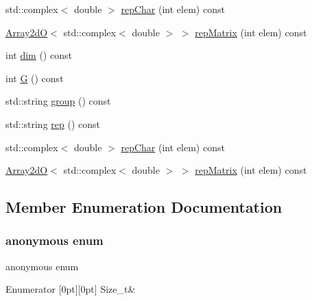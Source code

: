\begin{DoxyCompactItemize}
\item 
std\+::complex$<$ double $>$ \mbox{\hyperlink{structHadron_1_1HgRep_a49537241226a4b230d73e72cb1a21de3}{rep\+Char}} (int elem) const
\item 
\mbox{\hyperlink{classADAT_1_1Array2dO}{Array2dO}}$<$ std\+::complex$<$ double $>$ $>$ \mbox{\hyperlink{structHadron_1_1HgRep_a1ca0a9c28a8e0a9aba561029b7e61f08}{rep\+Matrix}} (int elem) const
\item 
int \mbox{\hyperlink{structHadron_1_1HgRep_ad951f39b175b012e73b0f66217b25032}{dim}} () const
\item 
int \mbox{\hyperlink{structHadron_1_1HgRep_a80baf377b3f2e8d633bba539efea8d04}{G}} () const
\item 
std\+::string \mbox{\hyperlink{structHadron_1_1HgRep_a271e1ec9a6f40512f32c8c573e42dff7}{group}} () const
\item 
std\+::string \mbox{\hyperlink{structHadron_1_1HgRep_a229b19e7f1d4fa443b715de9b5ed4454}{rep}} () const
\item 
std\+::complex$<$ double $>$ \mbox{\hyperlink{structHadron_1_1HgRep_a49537241226a4b230d73e72cb1a21de3}{rep\+Char}} (int elem) const
\item 
\mbox{\hyperlink{classADAT_1_1Array2dO}{Array2dO}}$<$ std\+::complex$<$ double $>$ $>$ \mbox{\hyperlink{structHadron_1_1HgRep_a1ca0a9c28a8e0a9aba561029b7e61f08}{rep\+Matrix}} (int elem) const
\end{DoxyCompactItemize}


\subsection{Member Enumeration Documentation}
\mbox{\label{structHadron_1_1HgRep_a4f16846723d4081fea15b5906cf27af3}} 
\subsubsection{\texorpdfstring{anonymous enum}{anonymous enum}}
{\footnotesize\ttfamily anonymous enum}

\begin{DoxyEnumFields}{Enumerator}
[0pt][0pt]{}\mbox{\label{structHadron_1_1HgRep_a4f16846723d4081fea15b5906cf27af3a7090534cc35068f510d194147450b3f7}} 
Size\+\_\+t&\\
\hline

\end{DoxyEnumFields}
\mbox{\label{structHadron_1_1HgRep_a28a92766125066036e71f5b29771b239}} 

